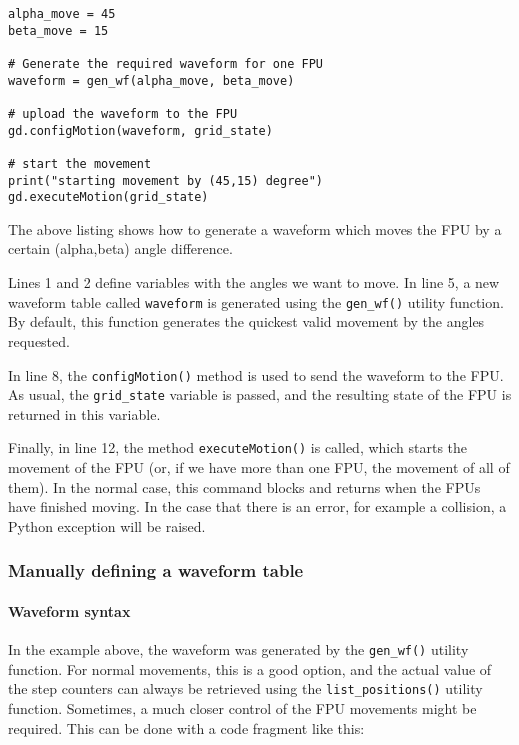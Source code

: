 \documentclass{scrartcl}[12pt,a4paper]
\begin{document}
\begin{verbatim}
alpha_move = 45
beta_move = 15

# Generate the required waveform for one FPU
waveform = gen_wf(alpha_move, beta_move)

# upload the waveform to the FPU
gd.configMotion(waveform, grid_state)

# start the movement
print("starting movement by (45,15) degree")
gd.executeMotion(grid_state)
\end{verbatim}

The above listing shows how to generate a waveform which moves the FPU
by a certain (alpha,beta) angle difference.

Lines 1 and 2 define variables with the angles we want to move. In
line 5, a new waveform table called \texttt{waveform} is generated
using the \texttt{gen\_wf()} utility function.  By default, this
function generates the quickest valid movement by the angles
requested.

In line 8, the \texttt{configMotion()} method is used to send the
waveform to the FPU. As usual, the \texttt{grid\_state} variable is
passed, and the resulting state of the FPU is returned in this
variable.

Finally, in line 12, the method \texttt{executeMotion()} is called,
which starts the movement of the FPU (or, if we have more than one
FPU, the movement of all of them). In the normal case, this command
blocks and returns when the FPUs have finished moving.  In the case
that there is an error, for example a collision, a Python exception
will be raised.



\subsubsection{Manually defining a waveform table}

\paragraph{Waveform syntax}

In the example above, the waveform was generated by the
\texttt{gen\_wf()} utility function.  For normal movements, this is a
good option, and the actual value of the step counters can always be
retrieved using the \texttt{list\_positions()} utility
function. Sometimes, a much closer control of the FPU movements might
be required. This can be done with a code fragment like this:
\end{document}
